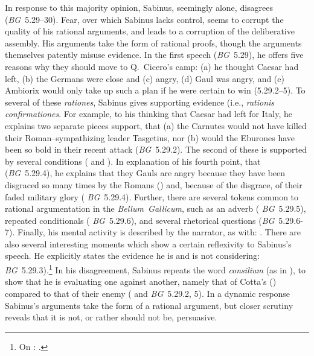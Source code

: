 \documentclass[12pt,letterpaper,oneside,final]{memoir}
\begin{document}
In response to this majority opinion, Sabinus, seemingly alone, disagrees (\emph{BG}~5.29--30). Fear, over which Sabinus lacks control, seems to corrupt the quality of his rational arguments, and leads to a corruption of the deliberative assembly. His arguments take the form of rational proofs, though the arguments themselves patently misuse evidence. In the first speech (\emph{BG}~5.29), he offers five reasons why they should move to Q.~Cicero's camp: (a) he thought Caesar had left, (b) the Germans were close and (c) angry, (d) Gaul was angry, and (e) Ambiorix would only take up such a plan if he were certain to win (5.29.2--5). To several of these \emph{rationes}, Sabinus gives supporting evidence (i.e., \emph{rationis confirmationes}. For example, to his thinking that Caesar had left for Italy, he explains two separate pieces support, that (a) the Carnutes would not have killed their Roman--sympathizing leader Tasgetius, nor (b) would the Eburones have been so bold in their recent attack (\emph{BG}~5.29.2). The second of these is supported by several conditions ( and ). In explanation of his fourth point, that  (\emph{BG}~5.29.4), he explains that they Gauls are angry because they have been disgraced so many times by the Romans () and, because of the disgrace, of their faded military glory ( \emph{BG}~5.29.4). Further, there are several tokens common to rational argumentation in the \emph{Bellum~Gallicum}, such as an adverb ( \emph{BG}~5.29.5), repeated conditionals ( \emph{BG}~5.29.6), and several rhetorical questions (\emph{BG}~5.29.6-7). Finally, his mental activity is described by the narrator, as with: . There are also several interesting moments which show a certain reflexivity to Sabinus's speech. He explicitly states the evidence he is and is not considering:  \emph{BG}~5.29.3).\footnote{On : .} In his disagreement, Sabinus repeats the word \emph{consilium} (as in ), to show that he is evaluating one against another, namely that of Cotta's () compared to that of their enemy ( and  \emph{BG}~5.29.2, 5). In a dynamic response Sabinus's arguments take the form of a rational argument, but closer scrutiny reveals that it is not, or rather should not be, persuasive.
\end{document}
